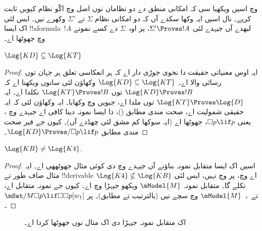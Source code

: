 \documentclass[../../../include/open-logic-section]{subfiles}
\begin{document}


 وچ اسیں ویکھیا سی کہ امکانی منطق دے دو نظاماں نوں اصل وچ اکّو نظام کیویں ثابت کریے۔  نال اسیں ایہ وکھا سکدے آں کہ دو امکانی نظام $\Sigma$ تے $\Sigma'$ وکھرے نیں۔ ایس لئی اک ایسا !!a{formula}~$!A$ لبھدے آں جیہدے لئی $\Sigma' \Proves !A$، پر اوہ~$\Sigma$ دے کسے نمونے وچ جھوٹھا اے۔

\begin{prop}
  $\Log{KD} \subsetneq \Log{KT}$
\end{prop}

\begin{proof} ایہ اوس معنیاتی حقیقت دا نحوی جوڑی دار اے کہ ہر انعکاسی تعلق ہر جہان توں رسائی والا اے۔ $\Log{KD} \subseteq
  \Log{KT}$ وکھاؤن لئی سانوں ویکھنا اے کہ $\Log{KD} \Proves !B$ توں
  $\Log{KT} \Proves !B$ نکلدا اے۔ ایہ $\Log{KT} \Proves
  \Log{D}$ توں ملدا اے، جیویں
   وچ وکھایا۔ ایہ وکھاؤن لئی کہ ایہ حقیقی شمولیت اے، صحت مندی مطابق
  ()،  دا ایسا نمونہ دینا کافی اے جیہدے وچ ، یعنی $\Box p \lif p$، جھوٹھا اے (ایہ سوکھا کم مشق لئی چھڈدے آں)۔ کیوں جے فیر صحت مندی مطابق $\Log{KD}
  \Proves/ \Box p \lif p$۔
\end{proof}

\begin{prop}
  $\Log{KB} \neq \Log{K4}$. 
\end{prop}

\begin{proof}
  اسیں اک ایسا متقابل نمونہ بناؤنے آں جیہدے وچ  دی کوئی مثال جھوٹھھی اے۔ ایہ مثال صاف طور تے !!{derivable} اے  وچ، پر  وچ نہیں، ایس لئی $\Log{K4} \nsubseteq \Log{KB}$ نکلے گا۔
  متقابل نمونہ $\mModel{M}$ ویکھو جیہڑا  وچ اے۔ کیوں جے نمونہ متقابل اے،  تے~،~$\mModel{M}$ وچ سچے نیں
  (بالترتیب  تے
   مطابق)۔ پر
  $\mSat/{M}{\Box p \lif \Box\Box p}[w_1]$۔
\end{proof}

\begin{figure}[htpb]
  \centering
  \caption{اک متقابل نمونہ جیہڑا  دی اک مثال نوں جھوٹھا کردا اے۔}
\end{figure}
\end{document}
